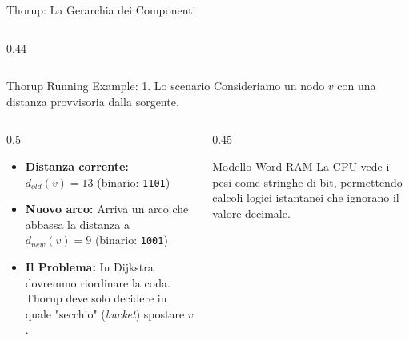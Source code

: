 \documentclass[aspectratio=169]{beamer}
\begin{document}
\begin{frame}{Thorup: La Gerarchia dei Componenti}
\begin{columns}[T]
\begin{column}{0.44\textwidth}
{%
            }
        \end{column}
    \end{columns}
\end{frame}

\begin{frame}{Thorup Running Example: 1. Lo scenario}
    Consideriamo un nodo $v$ con una distanza provvisoria dalla sorgente.
    \vspace{0.3cm}
    \begin{columns}[T]
        \begin{column}{0.5\textwidth}
            \begin{itemize}
                \item \textbf{Distanza corrente:} $d_{old}(v) = 13$ (binario: \texttt{1101})
                \item \textbf{Nuovo arco:} Arriva un arco che abbassa la distanza a $d_{new}(v) = 9$ (binario: \texttt{1001})
                \item \textbf{Il Problema:} In Dijkstra dovremmo riordinare la coda. Thorup deve solo decidere in quale "secchio" (\textit{bucket}) spostare $v$.
            \end{itemize}
        \end{column}
        \begin{column}{0.45\textwidth}
            \centering
            \begin{block}{Modello Word RAM}
                La CPU vede i pesi come stringhe di bit, permettendo calcoli logici istantanei che ignorano il valore decimale.
            \end{block}
    \end{column}
    \end{columns}
\end{frame}
\end{document}
